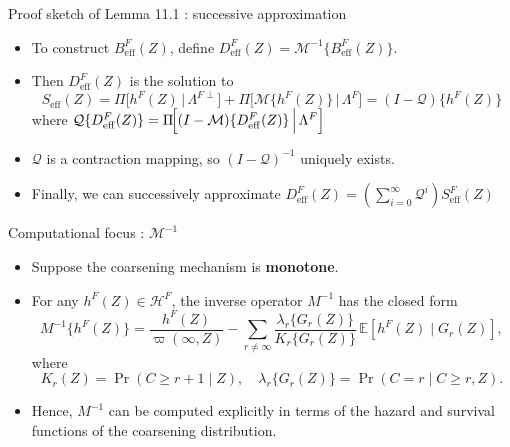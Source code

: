 \documentclass[xcolor=dvipsnames,aspectratio=169]{beamer}
\newcommand{\1}{\mathbbm{1}}
\begin{document}
\begin{frame}{Proof sketch of Lemma 11.1 : successive approximation}
  \begin{itemize}
    \item To construct $B^{F}_{\mathrm{eff}}(Z)$, define $D^{F}_{\mathrm{eff}}(Z)=\mathcal{M}^{-1}\{B^{F}_{\mathrm{eff}}(Z)\}$.
    \item Then $D^{F}_{\mathrm{eff}}(Z)$ is the solution to 
    \[
    S_{\mathrm{eff}}(Z)
= \Pi\!\bigl[h^{F}(Z)\,\big|\,\Lambda^{F\perp}\bigr]
+ \Pi\!\bigl[\mathcal{M}\{h^{F}(Z)\}\,\big|\,\Lambda^{F}\bigr]
= (I-\mathcal{Q})\{h^{F}(Z)\}
    \]
    where $\mathcal{Q}\{D^{F}_{\mathrm{eff}}(Z)\}
= \Pi\!\Bigl[(I-\mathcal{M})\{D^{F}_{\mathrm{eff}}(Z)\}\,\Big|\,\Lambda^{F}\Bigr]$
  \item $\mathcal{Q}$ is a contraction mapping, so $(I-\mathcal{Q})^{-1}$ uniquely exists.
  \item Finally, we can successively approximate $D^{F}_{\mathrm{eff}}(Z)=(\sum_{i=0}^{\infty}\mathcal{Q}^i)S^{F}_{\mathrm{eff}}(Z)$
  \end{itemize}
\end{frame}

\begin{frame}{Computational focus : $\mathcal{M}^{-1}$}
  \begin{tcolorbox}[colframe=Cyan,title=Theorem 11.2]
    \begin{itemize}
      \item Suppose the coarsening mechanism is \textbf{monotone}.
      \item For any $h^{F}(Z)\in\mathcal{H}^{F}$, the inverse operator $M^{-1}$ has the closed form
      \[
        M^{-1}\{h^{F}(Z)\}
        = \frac{h^{F}(Z)}{\varpi(\infty,Z)}
        - \sum_{r\neq\infty}
          \frac{\lambda_{r}\{G_{r}(Z)\}}{K_{r}\{G_{r}(Z)\}}
          \,\mathbb{E}\!\left[ h^{F}(Z)\mid G_{r}(Z)\right],
      \]
      where
      \[
        K_{r}(Z) = \Pr(C\ge r+1\mid Z), 
        \quad
        \lambda_{r}\{G_{r}(Z)\} = \Pr(C=r\mid C\ge r, Z).
      \]
      \item Hence, $M^{-1}$ can be computed explicitly in terms of the hazard and survival functions of the coarsening distribution.
    \end{itemize}
  \end{tcolorbox}
\end{frame}
\end{document}
